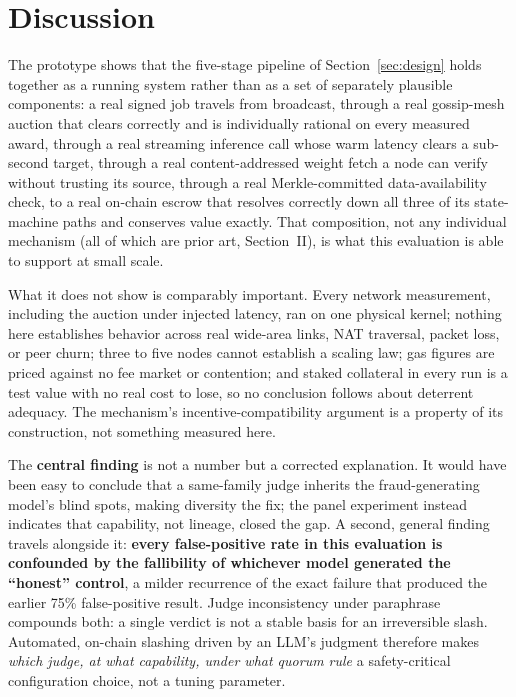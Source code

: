 \documentclass[conference]{IEEEtran}
\begin{document}
\section{Discussion}

The prototype shows that the five-stage pipeline of Section~\ref{sec:design} holds together as a
running system rather than as a set of separately plausible components: a real signed job travels
from broadcast, through a real gossip-mesh auction that clears correctly and is individually
rational on every measured award, through a real streaming inference call whose warm latency
clears a sub-second target, through a real content-addressed weight fetch a node can verify
without trusting its source, through a real Merkle-committed data-availability check, to a real
on-chain escrow that resolves correctly down all three of its state-machine paths and conserves
value exactly. That composition, not any individual mechanism (all of which are prior art,
Section~II), is what this evaluation is able to support at small scale.

What it does not show is comparably important. Every network measurement, including the auction
under injected latency, ran on one physical kernel; nothing here establishes behavior across real
wide-area links, NAT traversal, packet loss, or peer churn; three to five nodes cannot establish a
scaling law; gas figures are priced against no fee market or contention; and staked collateral in
every run is a test value with no real cost to lose, so no conclusion follows about deterrent
adequacy. The mechanism's incentive-compatibility argument is a property of its construction, not
something measured here.

The \textbf{central finding} is not a number but a corrected explanation. It would have been easy
to conclude that a same-family judge inherits the fraud-generating model's blind spots, making
diversity the fix; the panel experiment instead indicates that capability, not lineage, closed the
gap. A second, general finding travels alongside it: \textbf{every false-positive rate in this
evaluation is confounded by the fallibility of whichever model generated the ``honest''
control}, a milder recurrence of the exact failure that produced the earlier 75\% false-positive
result. Judge inconsistency under paraphrase compounds both: a single verdict is not a stable basis
for an irreversible slash. Automated, on-chain slashing driven by an LLM's judgment therefore makes
\emph{which judge, at what capability, under what quorum rule} a safety-critical configuration
choice, not a tuning parameter.
\end{document}
